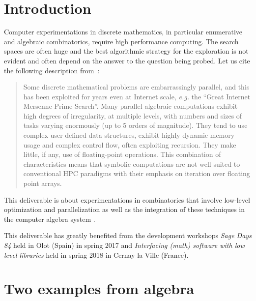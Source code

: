 \documentclass{deliverablereport}
\author{V. Delecroix, F. Hivert}
\begin{document}
\maketitle

\tableofcontents


\section{Introduction}

Computer experimentations in discrete mathematics, in particular
enumerative and algebraic combinatorics, require high performance
computing. The search spaces are often huge and the best algorithmic
strategy for the exploration is not evident and often depend on
the answer to the question being probed. Let us cite the following description
from~\cite{LoidlTrinder-Hecke}:
\begin{quote}{}
  Some discrete mathematical problems are embarrassingly parallel, and this
  has been exploited for years even at Internet scale, \emph{e.g.} the “Great
  Internet Mersenne Prime Search”.  Many parallel algebraic computations
  exhibit high degrees of irregularity, at multiple levels, with numbers and
  sizes of tasks varying enormously (up to 5 orders of magnitude). They tend
  to use complex user-defined data structures, exhibit highly dynamic memory
  usage and complex control flow, often exploiting recursion. They make
  little, if any, use of floating-point operations.  This combination of
  characteristics means that symbolic computations are not well suited to
  conventional HPC paradigms with their emphasis on iteration over floating
  point arrays.
\end{quote}

This deliverable is about experimentations in combinatorics
that involve low-level optimization and parallelization as
well as the integration of these techniques in the computer
algebra system \Sage.

This deliverable has greatly benefited from the \ODK development
workshops \textit{Sage Days 84} held in Olot (Spain) in spring 2017
and \textit{Interfacing (math) software with low level libraries}
held in spring 2018 in Cernay-la-Ville (France).


\section{Two examples from algebra}
\end{document}
